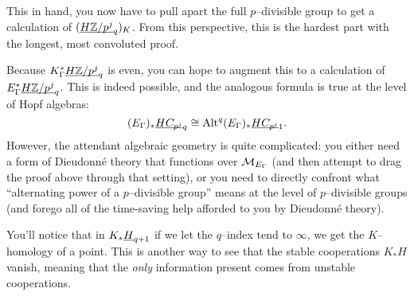 \begin{remark}
This in hand, you now have to pull apart the full $p$--divisible group to get a calculation of $(\underline{\smash{H\mathbb Z/p^j}}_{q})_K$.  From this perspective, this is the hardest part with the longest, most convoluted proof.
\end{remark}

\begin{remark}
Because $K_\Gamma^* \underline{\smash{H\mathbb Z/p^j}}_{q}$ is even, you can hope to augment this to a calculation of $E_\Gamma^* \underline{\smash{H\mathbb Z/p^j}}_{q}$.  This is indeed possible, and the analogous formula is true at the level of Hopf algebras: \[(E_\Gamma)_* \underline{\smash{HC_{p^j}}}_{q} \cong \operatorname{Alt}^q (E_\Gamma)_* \underline{\smash{HC_{p^j}}}_{1}.\] However, the attendant algebraic geometry is quite complicated: you either need a form of Dieudonn\'e theory that functions over $\mathcal{M}_{E_\Gamma}$ (and then attempt to drag the proof above through that setting), or you need to directly confront what ``alternating power of a $p$--divisible group'' means at the level of $p$--divisible groups (and forego all of the time-saving help afforded to you by Dieudonn\'e theory).
\end{remark}











\begin{remark}
You'll notice that in $K_* \underline{\smash{H}}_{q+1}$ if we let the $q$--index tend to $\infty$, we get the $K$--homology of a point.  This is another way to see that the stable cooperations $K_* H$ vanish, meaning that the \emph{only} information present comes from unstable cooperations.
\end{remark}















